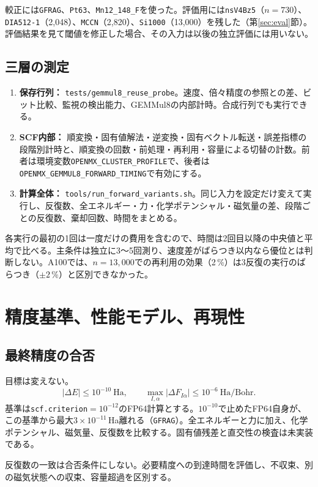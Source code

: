 \documentclass[a4paper,11pt]{ltjsarticle}
\newcommand{\code}[1]{\texttt{#1}}
\newcommand{\E}[1]{\times10^{#1}}
\begin{document}
\medskip
較正には\code{GFRAG}、\code{Pt63}、\code{Mn12\_148\_F}を使った。評価用には\code{nsV4Bz5}（$n=730$）、\code{DIA512-1}（2,048）、\code{MCCN}（2,820）、\code{Si1000}（13,000）を残した（第\ref{sec:eval}節）。評価結果を見て閾値を修正した場合、その入力は以後の独立評価には用いない。

\subsection{三層の測定}
\begin{enumerate}
\item \textbf{保存行列：} \code{tests/gemmul8\_reuse\_probe}。速度、倍々精度の参照との差、ビット比較、監視の検出能力、GEMMul8の内部計時。合成行列でも実行できる。
\item \textbf{SCF内部：} 順変換・固有値解法・逆変換・固有ベクトル転送・誤差指標の段階別計時と、順変換の回数・前処理・再利用・容量による切替の計数。前者は環境変数\code{OPENMX\_CLUSTER\_PROFILE}で、後者は\code{OPENMX\_GEMMUL8\_FORWARD\_TIMING}で有効にする。
\item \textbf{計算全体：} \code{tools/run\_forward\_variants.sh}。同じ入力を設定だけ変えて実行し、反復数、全エネルギー・力・化学ポテンシャル・磁気量の差、段階ごとの反復数、棄却回数、時間をまとめる。
\end{enumerate}
各実行の最初の1回は一度だけの費用を含むので、時間は2回目以降の中央値と平均で比べる。主条件は独立に3〜5回測り、速度差がばらつき以内なら優位とは判断しない。A100では、$n=13{,}000$での再利用の効果（2\,\%）は3反復の実行のばらつき（$\pm2\,\%$）と区別できなかった。

\section{精度基準、性能モデル、再現性}
\subsection{最終精度の合否}
目標は変えない。
\begin{equation}
 |\Delta E|\le10^{-10}\ \mathrm{Ha},\qquad
 \max_{I,\alpha}|\Delta F_{I\alpha}|\le10^{-6}\ \mathrm{Ha/Bohr}.
 \label{eq:targets}
\end{equation}
基準は\code{scf.criterion}$=10^{-12}$のFP64計算とする。$10^{-10}$で止めたFP64自身が、この基準から最大$3\E{-11}$\,Ha離れる（\code{GFRAG}）。全エネルギーと力に加え、化学ポテンシャル、磁気量、反復数を比較する。固有値残差と直交性の検査は未実装である。

反復数の一致は合否条件にしない。必要精度への到達時間を評価し、不収束、別の磁気状態への収束、容量超過を区別する。
\end{document}
